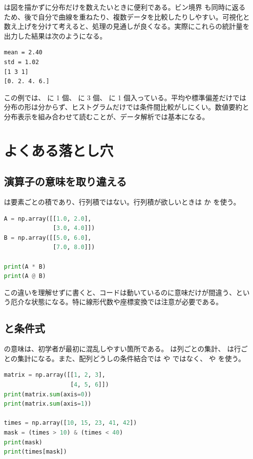  は図を描かずに分布だけを数えたいときに便利である。ビン境界  も同時に返るため、後で自分で曲線を重ねたり、複数データを比較したりしやすい。可視化と数え上げを分けて考えると、処理の見通しが良くなる。実際にこれらの統計量を出力した結果は次のようになる。

\begin{lstlisting}[numbers=none, xleftmargin=2\zw]
mean = 2.40
std = 1.02
[1 3 1]
[0. 2. 4. 6.]
\end{lstlisting}

この例では、\code{[0, 2)} に 1 個、\code{[2, 4)} に 3 個、\code{[4, 6]} に 1 個入っている。平均や標準偏差だけでは分布の形は分からず、ヒストグラムだけでは条件間比較がしにくい。数値要約と分布表示を組み合わせて読むことが、データ解析では基本になる。

\section{よくある落とし穴}

\subsection{演算子の意味を取り違える}

\code{*} は要素ごとの積であり、行列積ではない。行列積が欲しいときは  か  を使う。

\begin{lstlisting}[language=Python]
A = np.array([[1.0, 2.0],
              [3.0, 4.0]])
B = np.array([[5.0, 6.0],
              [7.0, 8.0]])

print(A * B)
print(A @ B)
\end{lstlisting}

この違いを理解せずに書くと、コードは動いているのに意味だけが間違う、という厄介な状態になる。特に線形代数や座標変換では注意が必要である。

\subsection{ と条件式}

 の意味は、初学者が最初に混乱しやすい箇所である。 は列ごとの集計、 は行ごとの集計になる。また、配列どうしの条件結合では  や  ではなく、\code{\&} や \code{|} を使う。

\begin{lstlisting}[language=Python]
matrix = np.array([[1, 2, 3],
                   [4, 5, 6]])
print(matrix.sum(axis=0))
print(matrix.sum(axis=1))

times = np.array([10, 15, 23, 41, 42])
mask = (times > 10) & (times < 40)
print(mask)
print(times[mask])
\end{lstlisting}

